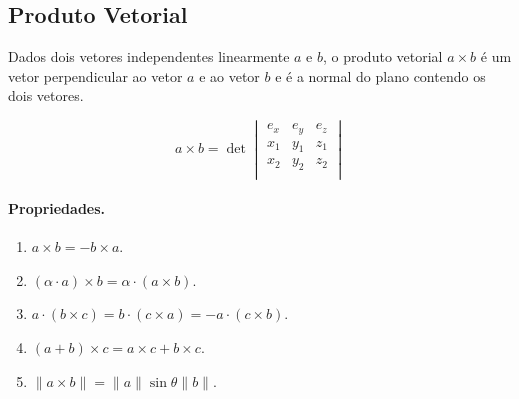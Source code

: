 \subsection{Produto Vetorial}

Dados dois vetores independentes linearmente $a$ e $b$, o produto vetorial $a \times b$ é um vetor perpendicular ao vetor $a$ e ao vetor $b$ e é a normal do plano contendo os dois vetores.

\[
a \times b = \det
\begin{vmatrix}
e_x & e_y & e_z \\
x_1 & y_1 & z_1 \\
x_2 & y_2 & z_2 \\
\end{vmatrix}
\]

\paragraph{Propriedades.}

\begin{multicols}{2}
	\begin{enumerate}
		\item $a \times b = -b \times a$.
		\item $(\alpha \cdot a) \times b = \alpha \cdot (a \times b)$.
		\item $a \cdot (b \times c) = b\cdot (c \times a) = -a\cdot(c\times b)$.
		\item $(a+b)\times c = a\times c + b\times c$.
		\item $\|a \times b \| = \|a\|\sin\theta \|b\|$.
	\end{enumerate}
\end{multicols}